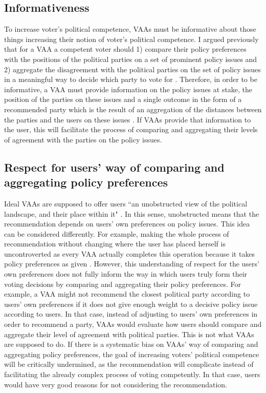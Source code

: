 \documentclass{scrartcl}
\begin{document}
\subsection{Informativeness}

To increase voter's political competence, VAAs must be informative about those things increasing their notion of voter's political competence. I argued previously that for a VAA a competent voter should 1) compare their policy preferences with the positions of the political parties on a set of prominent policy issues and 2) aggregate the disagreement with the political parties on the set of policy issues in a meaningful way to decide which party to vote for \cite{Mendez2017}. Therefore, in order to be informative, a VAA must provide information on the policy issues at stake, the position of the parties on these issues and a single outcome in the form of a recommended party which is the result of an aggregation of the distances between the parties and the users on these issues \cite{fossen2014s}. If VAAs provide that information to the user, this will facilitate the process of comparing and aggregating their levels of agreement with the parties on the policy issues. 


\subsection{Respect for users' way of comparing and aggregating policy preferences} 

Ideal VAAs are supposed to offer users ``an unobstructed view of the political landscape, and their place within it" \cite[291]{dinas2014look}. In this sense, unobstructed means that the recommendation depends on users' own preferences on policy issues. This idea can be considered differently. For example, making the whole process of recommendation without changing where the user has placed herself is uncontroverted as every VAA actually completes this operation because it takes policy preferences as given \cite{anderson2014matching}. However, this understanding of respect for the users' own preferences does not fully inform the way in which users truly form their voting decisions by comparing and aggregating their policy preferences. For example, a VAA might not recommend the closest political party according to users' own preferences if it does not give enough weight to a  decisive policy issue according to users. In that case, instead of adjusting to users' own preferences in order to recommend a party, VAAs would evaluate how users should compare and aggregate their level of agreement with political parties. This is not what VAAs are supposed to do. If there is a systematic bias on VAAs' way of comparing and aggregating policy preferences, the goal of increasing voters' political competence will be critically undermined, as the recommendation will complicate instead of facilitating the already complex process of voting competently. In that case, users would have very good reasons for not considering the recommendation. \\
\end{document}
